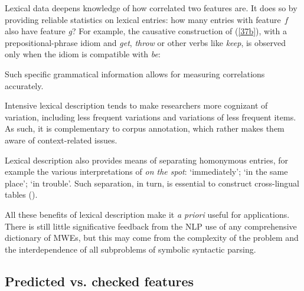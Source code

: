 \documentclass[output=paper]{langsci/langscibook}
\begin{document}
Lexical data deepens knowledge of how correlated two features  are. It does so by providing reliable statistics on lexical entries: how many entries with feature~\textit{f} also have feature \textit{g}? For example, the causative construction of (\ref{37b}), with a prepositional-phrase idiom and \textit{get}, \textit{throw} or other verbs like \textit{keep}, is observed only when the idiom is compatible with \textit{be}:

\begin{exe}
\ex \label{56}
 \begin{xlist}
\end{xlist}
\end{exe} 

\begin{exe}
\ex \label{57}
 \begin{xlist}
\end{xlist}
\end{exe}     

\noindent Such specific grammatical information allows for measuring correlations accurately.

Intensive lexical description tends to make researchers more cognizant of variation, including less frequent variations and variations of less frequent items. As such, it is complementary to corpus annotation, which rather makes them aware of context-related issues.

Lexical description also provides means of separating homonymous entries, for example the various interpretations of \textit{on the spot}: ‘immediately’; ‘in the same place’; ‘in trouble’. Such separation, in turn, is essential to construct cross-lingual tables (\citealt{Ranchhod}).

All these benefits of lexical description make it \textit{a priori} useful for applications. There is still little significative feedback from the NLP use of any comprehensive dictionary of MWEs, but this may come from the complexity of the problem and the interdependence of all subproblems of symbolic syntactic parsing. 

\subsection{Predicted vs. checked features} 
\end{document}
